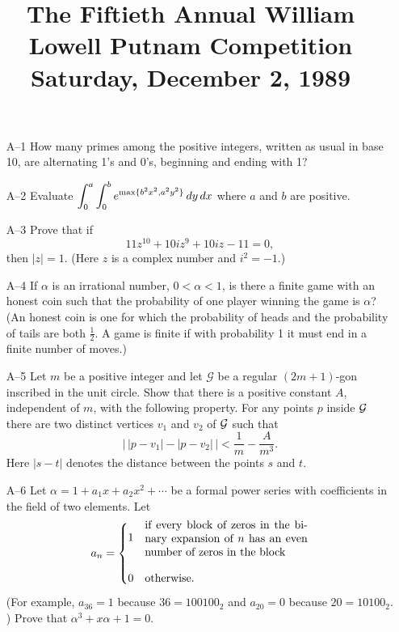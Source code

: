 \documentclass[amssymb,twocolumn,pra,10pt,aps]{revtex4-1}
\begin{document}
\title{The Fiftieth Annual William Lowell Putnam Competition \\
    Saturday, December 2, 1989}
\maketitle

\begin{itemize}
\item[A--1]
How many primes among the positive integers, written as usual in base 10,
are alternating 1's and 0's, beginning and ending with 1?

\item[A--2]
Evaluate
$\displaystyle{\int_0^a\int_0^b e^{{\rm max}\{b^2x^2, a^2y^2\}}\,dy\,dx}$
where $a$ and $b$ are positive.

\item[A--3]
Prove that if
\[
11z^{10}+10iz^9+10iz-11=0,
\]
then $|z|=1.$ (Here $z$ is a complex number and $i^2=-1$.)

\item[A--4]
If $\alpha$ is an irrational number, $0 < \alpha < 1$, is there a
finite game with an honest coin such that the probability of one player
winning the game is $\alpha$? (An honest coin is one for which the
probability of heads and the probability of tails are both $\frac12$.
A game is finite if with probability 1 it must end in a finite number of moves.)

\item[A--5]
Let $m$ be a positive integer and let $\mathcal{G}$ be a regular $(2m+1)$-gon
inscribed in the unit circle. Show that there is a positive constant $A$,
independent of $m$, with the following property. For any points $p$ inside
$\cal G$ there are two distinct vertices $v_1$ and $v_2$ of $\cal G$
such that
\[
\left|\,|p-v_1| - |p-v_2|\,\right| < \frac1{m} - \frac{A}{m^3}.
\]
Here $|s-t|$ denotes the distance between the points $s$ and $t$.

\item[A--6]
Let $\alpha=1+a_1x+a_2x^2+\cdots$ be a formal power series with coefficients
in the field of two elements. Let
\[
a_n =
\begin{cases}
1 & \parbox{2in}{if every block of zeros in the binary expansion of $n$
has an even number of zeros in the block} \\[.3in]
0 & \text{otherwise.}
\end{cases}
\]
(For example, $a_{36}=1$ because $36=100100_2$ and $a_{20}=0$ because
$20=10100_2.$)
Prove that $\alpha^3+x\alpha+1=0.$


\end{itemize}
\end{document}
